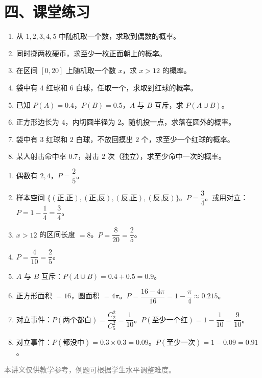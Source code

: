 \documentclass[12pt, a4paper]{ctexart}
\begin{document}
\section*{\textcolor{tipgreen}{四、课堂练习}}

\begin{enumerate}
  \item 从 $1, 2, 3, 4, 5$ 中随机取一个数，求取到偶数的概率。

  \item 同时掷两枚硬币，求至少一枚正面朝上的概率。

  \item 在区间 $[0, 20]$ 上随机取一个数 $x$，求 $x > 12$ 的概率。

  \item 袋中有 $4$ 红球和 $6$ 白球，任取一个，求取到红球的概率。

  \item 已知 $P(A) = 0.4$，$P(B) = 0.5$，$A$ 与 $B$ 互斥，求 $P(A \cup B)$。

  \item 正方形边长为 $4$，内切圆半径为 $2$。随机投一点，求落在圆外的概率。

  \item 袋中有 $3$ 红球和 $2$ 白球，不放回摸出 $2$ 个，求至少一个红球的概率。

  \item 某人射击命中率 $0.7$，射击 $2$ 次（独立），求至少命中一次的概率。
\end{enumerate}

\begin{knowledgebox}[参考答案]
\begin{enumerate}
  \item 偶数有 $2, 4$，$P = \dfrac{2}{5}$。

  \item 样本空间 $\{(\text{正,正}),(\text{正,反}),(\text{反,正}),(\text{反,反})\}$。$P = \dfrac{3}{4}$。或用对立：$P = 1 - \dfrac{1}{4} = \dfrac{3}{4}$。

  \item $x > 12$ 的区间长度 $= 8$。$P = \dfrac{8}{20} = \dfrac{2}{5}$。

  \item $P = \dfrac{4}{10} = \dfrac{2}{5}$。

  \item $A$ 与 $B$ 互斥：$P(A \cup B) = 0.4 + 0.5 = 0.9$。

  \item 正方形面积 $= 16$，圆面积 $= 4\pi$。$P = \dfrac{16 - 4\pi}{16} = 1 - \dfrac{\pi}{4} \approx 0.215$。

  \item 对立事件：$P(\text{两个都白}) = \dfrac{C_2^2}{C_5^2} = \dfrac{1}{10}$。$P(\text{至少一个红}) = 1 - \dfrac{1}{10} = \dfrac{9}{10}$。

  \item 对立事件：$P(\text{都没中}) = 0.3 \times 0.3 = 0.09$。$P(\text{至少一次}) = 1 - 0.09 = 0.91$。
\end{enumerate}
\end{knowledgebox}

\vfill
\begin{center}
\small\textcolor{gray}{本讲义仅供教学参考，例题可根据学生水平调整难度。}
\end{center}
\end{document}

